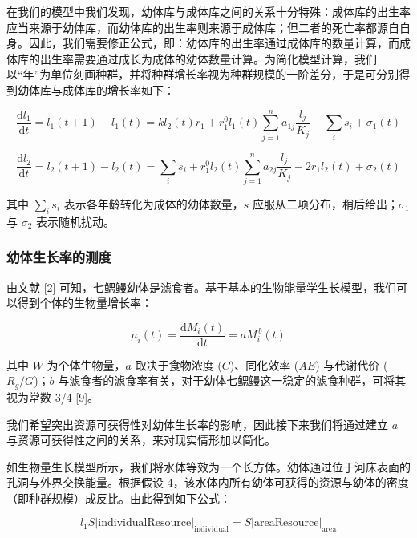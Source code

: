 \documentclass[11pt,a4paper]{ctexart}
\begin{document}
在我们的模型中我们发现，幼体库与成体库之间的关系十分特殊：成体库的出生率应当来源于幼体库，而幼体库的出生率则来源于成体库；但二者的死亡率都源自自身。因此，我们需要修正公式，即：幼体库的出生率通过成体库的数量计算，而成体库的出生率需要通过成长为成体的幼体数量计算。为简化模型计算，我们以“年”为单位刻画种群，并将种群增长率视为种群规模的一阶差分，于是可分别得到幼体库与成体库的增长率如下：

\begin{equation}
\frac{\mathrm{d}l_1}{\mathrm{d}t}=l_1(t+1)-l_1(t)=k l_2(t)r_1+r_1^{0}l_1(t)\sum_{j=1}^{n}a_{1j}\frac{l_j}{K_j}-\sum_{i}s_i+\sigma_1(t)
\end{equation}

\begin{equation}
\frac{\mathrm{d}l_2}{\mathrm{d}t}=l_2(t+1)-l_2(t)=\sum_{i}s_i+r_1^{0}l_2(t)\sum_{j=1}^{n}a_{2j}\frac{l_j}{K_j}-2r_1 l_2(t)+\sigma_2(t)
\end{equation}

其中 $\sum_{i}s_i$ 表示各年龄转化为成体的幼体数量，$s$ 应服从二项分布，稍后给出；$\sigma_1$ 与 $\sigma_2$ 表示随机扰动。

\subsubsection{幼体生长率的测度}

由文献 [2] 可知，七鳃鳗幼体是滤食者。基于基本的生物能量学生长模型，我们可以得到个体的生物量增长率：

\begin{equation}
\mu_i(t)=\frac{\mathrm{d}M_i(t)}{\mathrm{d}t}=aM_i^{\,b}(t)
\end{equation}

其中 $W$ 为个体生物量，$a$ 取决于食物浓度 ($C$)、同化效率 ($AE$) 与代谢代价 ($R_g/G$)；$b$ 与滤食者的滤食率有关，对于幼体七鳃鳗这一稳定的滤食种群，可将其视为常数 3/4 [9]。

我们希望突出资源可获得性对幼体生长率的影响，因此接下来我们将通过建立 $a$ 与资源可获得性之间的关系，来对现实情形加以简化。

如生物量生长模型所示，我们将水体等效为一个长方体。幼体通过位于河床表面的孔洞与外界交换能量。根据假设 4，该水体内所有幼体可获得的资源与幼体的密度（即种群规模）成反比。由此得到如下公式：

\begin{equation}
l_1 S\left|\mathrm{individualResource}\right|_{\mathrm{individual}}=S\left|\mathrm{areaResource}\right|_{\mathrm{area}}
\end{equation}
\end{document}
